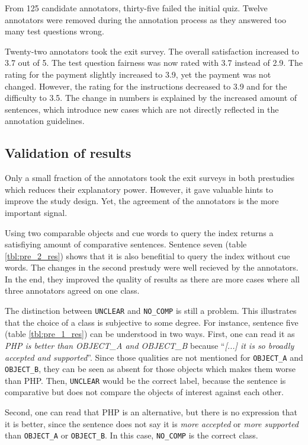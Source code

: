 From 125 candidate annotators, thirty-five failed the initial quiz. Twelve annotators were removed during the annotation process as they answered too many test questions wrong.

Twenty-two annotators took the exit survey. The overall satisfaction increased to 3.7 out of 5. The test question fairness was now rated with 3.7  instead of 2.9. The rating for the payment slightly increased to 3.9, yet the payment was not changed. However, the rating for the instructions decreased to 3.9 and for the difficulty to 3.5.
The change in numbers is explained by the increased amount of sentences, which introduce new cases which are not directly reflected in the annotation guidelines.
 
\subsection{Validation of results}
Only a small fraction of the annotators took the exit surveys in both prestudies which reduces their explanatory power. However, it gave valuable hints to improve the study design. Yet, the agreement of the annotators is the more important signal.


Using two comparable objects and cue words to query the index returns a satisfiying amount of comparative sentences. Sentence seven (table \ref{tbl:pre_2_res}) shows that it is also benefitial to query the index without cue words. The changes in the second prestudy were well recieved by the annotators. In the end, they improved the quality of results as there are more cases where all three annotators agreed on one class.


The distinction between \texttt{UNCLEAR} and \texttt{NO\_COMP} is still a problem. This illustrates that the choice of a class is subjective to some degree. For instance, sentence five (table \ref{tbl:pre_1_res}) can be understood in two ways. First, one can read it as \emph{PHP is better than OBJECT\_A and OBJECT\_B} because \enquote{\emph{[...] it is so broadly accepted and supported}}. Since those qualities are not mentioned for \texttt{OBJECT\_A} and \texttt{OBJECT\_B}, they can be seen as absent for those objects which makes them worse than PHP. Then, \texttt{UNCLEAR} would be the correct label, because the sentence is comparative but does not compare the objects of interest against each other.

Second, one can read that PHP is an alternative, but there is no expression that it is better, since the sentence does not say it is \emph{more accepted} or \emph{more supported} than \texttt{OBJECT\_A} or \texttt{OBJECT\_B}. In this case, \texttt{NO\_COMP} is the correct class.
\hfill\newline

